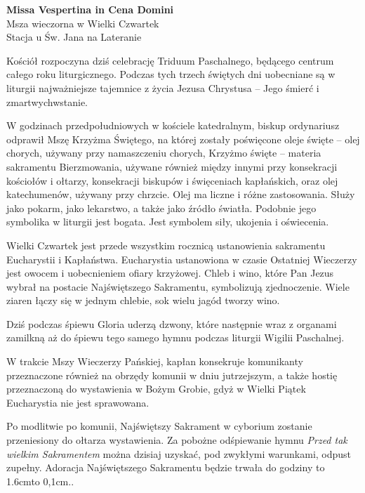 \documentclass[10pt,oneside,final,notitlepage,a4paper,wide]{mwart}
\def\dotfill#1{\cleaders\hbox to #1{.}\hfill}
\newcommand\dotline[2][0,1cm]{\leavevmode\hbox to #2{\dotfill{#1}\hfil}}
\begin{document}
%
\begin{center}
	\LARGE{\textbf{Missa Vespertina in Cena Domini}}\\ \smallskip
	\small{Msza wieczorna w Wielki Czwartek\\ \smallskip Stacja u Św. Jana na Lateranie}
\end{center} \vspace{1cm}

	Kościół rozpoczyna dziś celebrację Triduum Paschalnego, będącego centrum całego roku liturgicznego. Podczas tych trzech świętych dni uobecniane są w liturgii najważniejsze tajemnice z życia Jezusa Chrystusa -- Jego śmierć i zmartwychwstanie.

W godzinach przedpołudniowych w kościele katedralnym, biskup ordynariusz odprawił Mszę Krzyżma Świętego, na której zostały poświęcone oleje święte -- olej chorych, używany przy namaszczeniu chorych, Krzyżmo święte -- materia sakramentu Bierzmowania, używane również między innymi przy konsekracji kościołów i ołtarzy, konsekracji biskupów i święceniach kapłańskich, oraz olej katechumenów, używany przy chrzcie. Olej ma liczne i różne zastosowania. Służy jako pokarm, jako lekarstwo, a także jako źródło światła. Podobnie jego symbolika w liturgii jest bogata. Jest symbolem siły, ukojenia i oświecenia.

Wielki Czwartek jest przede wszystkim rocznicą ustanowienia sakramentu Eucharystii i Kapłaństwa. Eucharystia ustanowiona w czasie Ostatniej Wieczerzy jest owocem i uobecnieniem ofiary krzyżowej. Chleb i wino, które Pan Jezus wybrał na postacie Najświętszego Sakramentu, symbolizują zjednoczenie. Wiele ziaren łączy się w jednym chlebie, sok wielu jagód tworzy wino.

Dziś podczas śpiewu Gloria uderzą dzwony, które następnie wraz z organami zamilkną aż do śpiewu tego samego hymnu podczas liturgii Wigilii Paschalnej.

W trakcie Mszy Wieczerzy Pańskiej, kapłan konsekruje komunikanty przeznaczone również na obrzędy komunii w dniu jutrzejszym, a także hostię przeznaczoną do wystawienia w Bożym Grobie, gdyż w Wielki Piątek Eucharystia nie jest sprawowana.

Po modlitwie po komunii, Najświętszy Sakrament w cyborium zostanie przeniesiony do ołtarza wystawienia. Za pobożne odśpiewanie hymnu \emph{Przed tak wielkim Sakramentem} można dzisiaj uzyskać, pod zwykłymi warunkami, odpust zupełny. Adoracja Najświętszego Sakramentu będzie trwała do godziny \dotline{1.6cm}.
\end{document}
